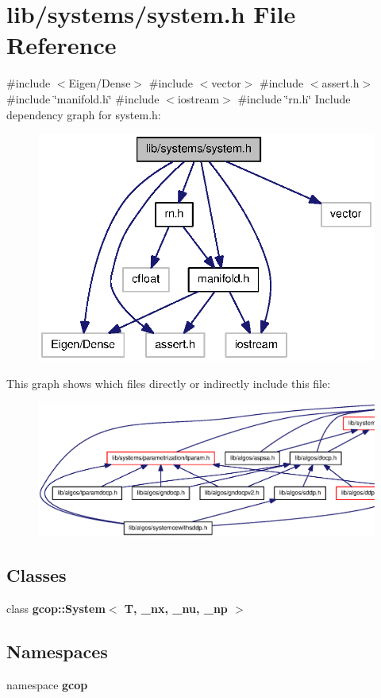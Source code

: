 \section{lib/systems/system.h \-File \-Reference}
\label{system_8h}
{\ttfamily \#include $<$\-Eigen/\-Dense$>$}\*
{\ttfamily \#include $<$vector$>$}\*
{\ttfamily \#include $<$assert.\-h$>$}\*
{\ttfamily \#include \char`\"{}manifold.\-h\char`\"{}}\*
{\ttfamily \#include $<$iostream$>$}\*
{\ttfamily \#include \char`\"{}rn.\-h\char`\"{}}\*
\-Include dependency graph for system.\-h\-:
\nopagebreak
\begin{figure}[H]
\begin{center}
\leavevmode
\includegraphics[width=336pt]{system_8h__incl}
\end{center}
\end{figure}
\-This graph shows which files directly or indirectly include this file\-:
\nopagebreak
\begin{figure}[H]
\begin{center}
\leavevmode
\includegraphics[width=350pt]{system_8h__dep__incl}
\end{center}
\end{figure}
\subsection*{\-Classes}
\begin{DoxyCompactItemize}
\item 
class {\bf gcop\-::\-System$<$ T, \-\_\-nx, \-\_\-nu, \-\_\-np $>$}
\end{DoxyCompactItemize}
\subsection*{\-Namespaces}
\begin{DoxyCompactItemize}
\item 
namespace {\bf gcop}
\end{DoxyCompactItemize}
